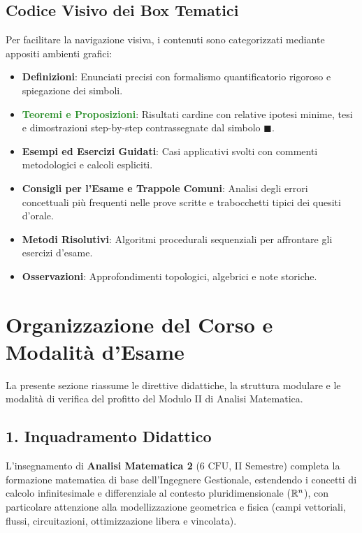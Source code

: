 \documentclass[11pt,a4paper,twoside,openright]{book}
\begin{document}
\section*{Codice Visivo dei Box Tematici}
Per facilitare la navigazione visiva, i contenuti sono categorizzati mediante appositi ambienti grafici:
\begin{itemize}
    \item \textbf{\textcolor{navyblue}{Definizioni}}: Enunciati precisi con formalismo quantificatorio rigoroso e spiegazione dei simboli.
    \item \textbf{\textcolor{forestgreen}{Teoremi e Proposizioni}}: Risultati cardine con relative ipotesi minime, tesi e dimostrazioni step-by-step contrassegnate dal simbolo $\blacksquare$.
    \item \textbf{\textcolor{purpleaccent}{Esempi ed Esercizi Guidati}}: Casi applicativi svolti con commenti metodologici e calcoli espliciti.
    \item \textbf{\textcolor{crimsonred}{Consigli per l'Esame e Trappole Comuni}}: Analisi degli errori concettuali più frequenti nelle prove scritte e trabocchetti tipici dei quesiti d'orale.
    \item \textbf{\textcolor{warmamber}{Metodi Risolutivi}}: Algoritmi procedurali sequenziali per affrontare gli esercizi d'esame.
    \item \textbf{\textcolor{navyblue!80}{Osservazioni}}: Approfondimenti topologici, algebrici e note storiche.
\end{itemize}

\cleardoublepage

\chapter*{Organizzazione del Corso e Modalità d'Esame}

La presente sezione riassume le direttive didattiche, la struttura modulare e le modalità di verifica del profitto del Modulo II di Analisi Matematica.

\section*{1. Inquadramento Didattico}
L'insegnamento di \textbf{Analisi Matematica 2} ($6\text{ CFU}$, II Semestre) completa la formazione matematica di base dell'Ingegnere Gestionale, estendendo i concetti di calcolo infinitesimale e differenziale al contesto pluridimensionale ($\mathbb{R}^n$), con particolare attenzione alla modellizzazione geometrica e fisica (campi vettoriali, flussi, circuitazioni, ottimizzazione libera e vincolata).
\end{document}
